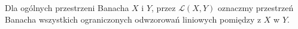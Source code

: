 Dla ogólnych przestrzeni Banacha $X$ i $Y$, przez
$\mathcal{L}(X,Y)$
oznaczmy przestrzeń Banacha wszystkich ograniczonych odwzorowań
liniowych pomiędzy z $X$ w $Y$.

%



%
%
%
%
